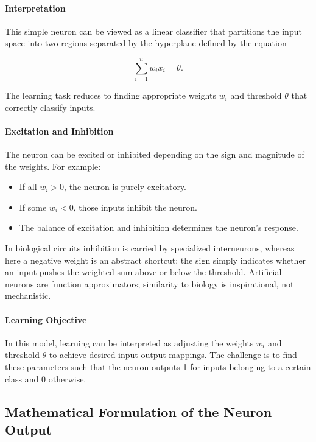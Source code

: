 \paragraph{Interpretation}

This simple neuron can be viewed as a linear classifier that partitions the input space into two regions separated by the hyperplane defined by the equation

\[
    \sum_{i=1}^n w_i x_i = \theta.
\]

The learning task reduces to finding appropriate weights \( w_i \) and threshold \(\theta\) that correctly classify inputs.

\paragraph{Excitation and Inhibition}

The neuron can be excited or inhibited depending on the sign and magnitude of the weights. For example:

\begin{itemize}
    \item If all \( w_i > 0 \), the neuron is purely excitatory.
    \item If some \( w_i < 0 \), those inputs inhibit the neuron.
    \item The balance of excitation and inhibition determines the neuron's response.
\end{itemize}
In biological circuits inhibition is carried by specialized interneurons, whereas here a negative weight is an abstract shortcut; the sign simply indicates whether an input pushes the weighted sum above or below the threshold. Artificial neurons are function approximators; similarity to biology is inspirational, not mechanistic.

\paragraph{Learning Objective}

In this model, learning can be interpreted as adjusting the weights \( w_i \) and threshold \(\theta\) to achieve desired input-output mappings. The challenge is to find these parameters such that the neuron outputs 1 for inputs belonging to a certain class and 0 otherwise.

\subsection{Mathematical Formulation of the Neuron Output}
\label{sec:perceptron_mathematical_formulation_of_the_neuron_output}

